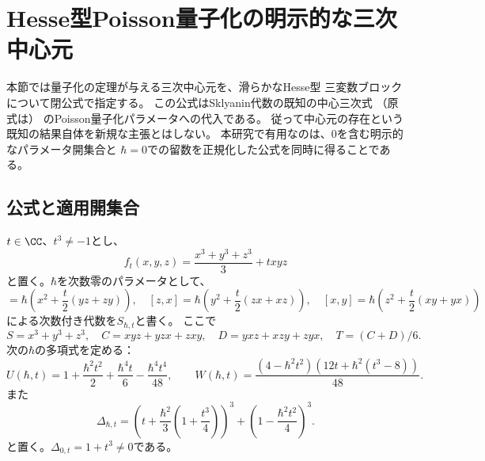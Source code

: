 \section{Hesse型Poisson量子化の明示的な三次中心元}
\label{sec:explicit-hesse-center}
本節では量子化の定理が与える三次中心元を、滑らかなHesse型
三変数ブロックについて閉公式で指定する。
この公式はSklyanin代数の既知の中心三次式
\cite[Theorem 1およびSection 2]{DeLaetLeBruyn}
（原式は\cite[p.~35, Remark (1)]{SmithTate}）
のPoisson量子化パラメータへの代入である。
従って中心元の存在という既知の結果自体を新規な主張とはしない。
本研究で有用なのは、$0$を含む明示的なパラメータ開集合と
$\hbar=0$での留数を正規化した公式を同時に得ることである。

\subsection{公式と適用開集合}
$t\in\CC$、$t^3\ne-1$とし、
\begin{equation}
 f_t(x,y,z)=\frac{x^3+y^3+z^3}{3}+txyz
\end{equation}
と置く。$\hbar$を次数零のパラメータとして、
\begin{equation}
 [y,z]=\hbar\left(x^2+\frac{t}{2}(yz+zy)\right),
 \quad
 [z,x]=\hbar\left(y^2+\frac{t}{2}(zx+xz)\right),
 \quad
 [x,y]=\hbar\left(z^2+\frac{t}{2}(xy+yx)\right)
 \label{eq:hesse-commutators}
\end{equation}
による次数付き代数を$S_{\hbar,t}$と書く。
ここで
\begin{equation}
 S=x^3+y^3+z^3,\quad
 C=xyz+yzx+zxy,\quad
 D=yxz+xzy+zyx,\quad T=(C+D)/6.
\end{equation}
次の$\hbar$の多項式を定める：
\begin{equation}
 U(\hbar,t)=1+\frac{\hbar^2t^2}{2}
  +\frac{\hbar^4t}{6}-\frac{\hbar^4t^4}{48},
 \qquad
 W(\hbar,t)=
 \frac{(4-\hbar^2t^2)
 (12t+\hbar^2(t^3-8))}{48}.
 \label{eq:hesse-UW}
\end{equation}
また
\begin{equation}
 \Delta_{\hbar,t}=
 \left(t+\frac{\hbar^2}{3}
       \left(1+\frac{t^3}{4}\right)\right)^3
  +\left(1-\frac{\hbar^2t^2}{4}\right)^3.
 \label{eq:hesse-discriminant}
\end{equation}
と置く。$\Delta_{0,t}=1+t^3\ne0$である。

